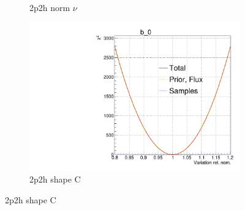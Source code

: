 \begin{figure}[h]
\begin{subfigure}[t]{0.32\textwidth}
		\caption{2p2h norm $\nu$}
	\end{subfigure}
	\begin{subfigure}[t]{0.32\textwidth}
		\includegraphics[width=\textwidth,page=111, trim={0mm 0mm 0mm 9mm}, clip]{figures/mach3/2018/llh/tryBinningNumber6_after_fit_asimov_asimov_ND280logL_scan}
		\caption{2p2h shape C}
	\end{subfigure}


\end{figure}
